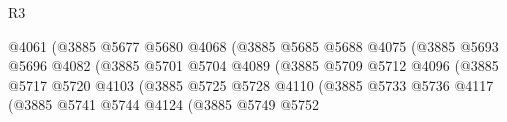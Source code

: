 \begin{lexlean}{R3}
\begin{coremodule}
                                                  @4061
                                                  (@3885
                                                    @5677
                                                    @5680
                                                    @4068
                                                    (@3885
                                                      @5685
                                                      @5688
                                                      @4075
                                                      (@3885
                                                        @5693
                                                        @5696
                                                        @4082
                                                        (@3885
                                                          @5701
                                                          @5704
                                                          @4089
                                                          (@3885
                                                            @5709
                                                            @5712
                                                            @4096
                                                            (@3885
                                                              @5717
                                                              @5720
                                                              @4103
                                                              (@3885
                                                                @5725
                                                                @5728
                                                                @4110
                                                                (@3885
                                                                  @5733
                                                                  @5736
                                                                  @4117
                                                                  (@3885
                                                                    @5741
                                                                    @5744
                                                                    @4124
                                                                    (@3885
                                                                      @5749
                                                                      @5752

\end{coremodule}
\end{lexlean}
